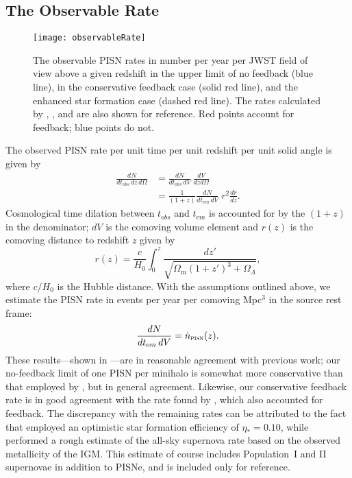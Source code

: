 \documentclass[../thesis.tex]{subfiles}
\begin{document}
\subsection{The Observable Rate}
\begin{figure}
 \begin{center}
   \texttt{[image: observableRate]}
   \caption{The observable PISN rates in number per year
     per JWST field of view above a given redshift in the upper limit
     of no feedback (blue line), in the conservative feedback case
     (solid red line), and the enhanced star formation case (dashed
     red line).  The rates calculated by
     \citet{Miralda-EscudeRees1997}, \citet{MackeyBrommHernquist2003},
     \citet{WeinmannLilly2005} and \citet{WiseAbel2005} are also shown
     for reference. Red points account for feedback; blue points do
     not.}
   \label{obsrate}
 \end{center}
\end{figure}
The observed PISN rate per unit time per unit redshift per unit solid
angle is given by
\begin{equation}
  \begin{split}
    \frac{dN}{dt_{\mathrm obs}\,dz\,d\Omega} &= \frac{dN}{dt_{\mathrm
        obs}\,dV} \, \frac{dV}{dz d\Omega}
    \\ &=\frac{1}{(1+z)}\frac{dN}{dt_{\mathrm em}\,dV} \;r^2
    \frac{dr}{dz}.
 \end{split}
\end{equation}
Cosmological time dilation between $t_{\mathrm obs}$ and $t_{\mathrm em}$ is
accounted for by the $(1+z)$ in the denominator; $dV$ is the
comoving volume element and $r(z)$ is the comoving distance to
redshift $z$ given by
\begin{equation}
r(z) = \frac{c}{H_0}\int_0^z \frac{dz'}{\sqrt{\Omega_{\mathrm m} (1+z')^3 +
    \Omega_{\Lambda}}},
\end{equation}
where $c/H_0$ is the Hubble distance.  With the assumptions outlined
above, we estimate the PISN rate in events per year per comoving
Mpc$^3$ in the source rest frame:
\begin{equation}
\frac{dN}{dt_{\mathrm em}\,dV} = \dot{n}_{\textsc{pisn}}(z).
\end{equation}
These results---shown in ---are in reasonable
agreement with previous work; our no-feedback limit of one PISN per
minihalo is somewhat more conservative than that employed by
\citet{WeinmannLilly2005}, but in general agreement.  Likewise, our
conservative feedback rate is in good agreement with the rate found by
\citet{WiseAbel2005}, which also accounted for feedback.  The
discrepancy with the remaining rates can be attributed to the fact
that \citet{MackeyBrommHernquist2003} employed an optimistic star
formation efficiency of $\eta_*=0.10$, while
\citet{Miralda-EscudeRees1997} performed a rough estimate of the
all-sky supernova rate based on the observed metallicity of the
IGM. This estimate of course includes Population~I and II supernovae in
addition to PISNe, and is included only for reference.
\end{document}
